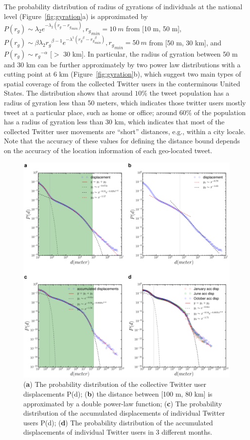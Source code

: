 \documentclass[ijgi,article,accept,moreauthors,pdftex,10pt,a4paper]{mdpi}
\theoremstyle{mdpi}
\newcounter{re}
\theoremstyle{mdpidefinition}
\begin{document}
The probability distribution of radius of gyrations of individuals at the national level (Figure~\ref{fig:gyration}a) is approximated by $P(r_{g}) \sim \lambda_{2} e^{-\lambda_{2}(r_{g} - {r_{g}}_{min})}, {r_{g}}_{min}=10~m$ from [10 m, 50 m], $ P(r_{g}) \sim \beta\lambda_{2}{r_{g}}^{\beta-1}e^{-\lambda^{1}({r_{g}}^\beta-{r_{g}}_{min}^\beta)}, {r_{g}}_{min}=50~m$ from [50 m, 30 km], and $P(r_{g}) \sim {r_{g}}^{-\alpha}$ [$>$ 30 km].
In particular, the radius of gyration between 50 m and 30 km can be further approximately by two power law distributions with a cutting point at 6 km (Figure~\ref{fig:gyration}b), which suggest two main types of spatial coverage of from the collected Twitter users in the conterminous United States.
The distribution shows that around $10\%$ the tweet population has a radius of gyration less than 50 meters, which indicates those twitter users mostly tweet at a particular place, such as home or office;  around 60$\%$ of the population has a radius of gyration less than 30 km, which indicates that most of the collected Twitter user movements are ``short'' distances, e.g., within a city locale. Note that the accuracy of these values for defining the distance bound depends on the accuracy of the location information of each geo-located tweet.

\begin{figure}[ht]
\centering
\includegraphics[width=1.0\linewidth]{./figures/displacement}
\caption{({\bf a}) The probability distribution of the collective Twitter user displacements P(d); ({\bf b}) the distance between [100 m, 80 km] is approximated by a double power-law function; ({\bf c}) The probability distribution of the accumulated displacements of individual Twitter users P(d); ({\bf d}) The probability distribution of the accumulated displacements of individual Twitter users in 3 different months.}

\label{fig:displacement}
\end{figure}
\FloatBarrier
\end{document}
